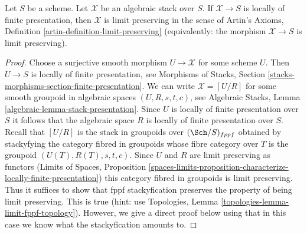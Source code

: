 \begin{lemma}
\label{lemma-locally-finite-presentation-limit-preserving}
Let $S$ be a scheme. Let $\mathcal{X}$ be an algebraic stack
over $S$. If $\mathcal{X} \to S$ is locally of finite presentation,
then $\mathcal{X}$ is limit preserving in the sense of
Artin's Axioms, Definition \ref{artin-definition-limit-preserving}
(equivalently: the morphism $\mathcal{X} \to S$ is limit preserving).
\end{lemma}

\begin{proof}
Choose a surjective smooth morphism $U \to \mathcal{X}$ for some scheme $U$.
Then $U \to S$ is locally of finite presentation, see
Morphisms of Stacks, Section
\ref{stacks-morphisms-section-finite-presentation}.
We can write $\mathcal{X} = [U/R]$ for some smooth groupoid in
algebraic spaces $(U, R, s, t, c)$, see
Algebraic Stacks, Lemma \ref{algebraic-lemma-stack-presentation}.
Since $U$ is locally of finite presentation over $S$
it follows that the algebraic space $R$ is
locally of finite presentation over $S$.
Recall that $[U/R]$ is the stack in groupoids over $(\Sch/S)_{fppf}$
obtained by stackyfying the category fibred in groupoids
whose fibre category over $T$ is the groupoid $(U(T), R(T), s, t, c)$.
Since $U$ and $R$ are limit preserving as functors
(Limits of Spaces, Proposition
\ref{spaces-limits-proposition-characterize-locally-finite-presentation})
this category fibred in groupoids is limit preserving.
Thus it suffices to show that fppf stackyfication preserves
the property of being limit preserving. This is true
(hint: use Topologies, Lemma
\ref{topologies-lemma-limit-fppf-topology}).
However, we give a direct proof below using that in this
case we know what the stackyfication amounts to.


\end{proof}
